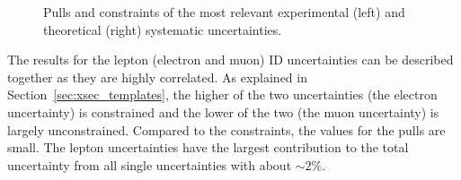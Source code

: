 \begin{figure}[htbp!]
  \begin{center}


\caption{Pulls and constraints of the most relevant experimental (left) and theoretical (right) systematic uncertainties. 
       \label{fig:res_pulls}}
  \end{center}
\end{figure}

The results for the lepton (electron and muon) ID uncertainties can be described together as they are highly correlated.
As explained in Section~\ref{sec:xsec_templates}, the higher of the two uncertainties (the electron uncertainty) is constrained and
the lower of the two (the muon uncertainty) is largely unconstrained. Compared to the constraints, the values for the pulls 
are small. The lepton uncertainties have the largest contribution to the total uncertainty from all single uncertainties with about $\sim 2 \%$. 


